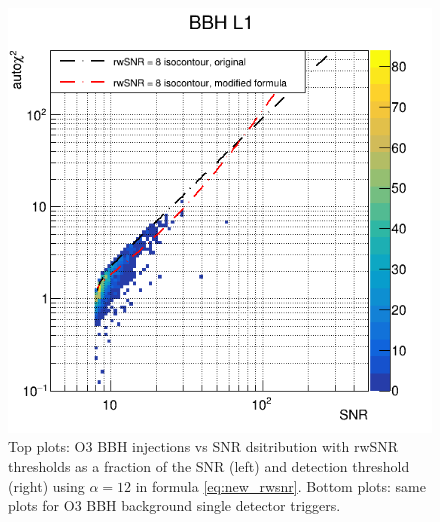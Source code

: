 \begin{figure}
\begin{minipage}{0.45\linewidth}
  \end{minipage}
  \hfill
  \begin{minipage}{0.45\linewidth}
    \centering
    \includegraphics[width=\linewidth]{sectionImprovement/rwSNR/cSnrAchi2_singles_new2_L1_a12.png}
  \end{minipage}
  \caption{Top plots: O3 BBH injections \achi vs SNR dsitribution with rwSNR thresholds as a fraction of the SNR (left) and detection threshold (right) using $\alpha = 12$ in formula \ref{eq:new_rwsnr}.
  Bottom plots: same plots for O3 BBH background single detector triggers.}
  \label{fig:all_thresh}
\end{figure}
